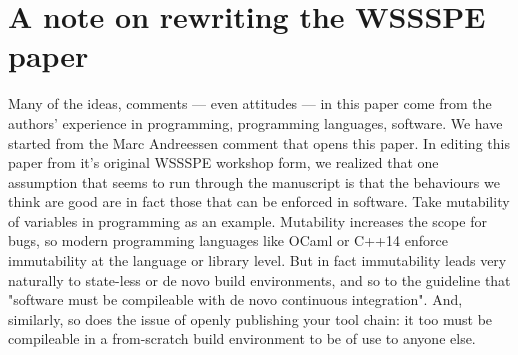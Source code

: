 \documentclass[a4paper,11pt]{article}
\begin{document}
\section{A note on rewriting the WSSSPE paper}

Many of the ideas, comments --- even attitudes --- in this paper come 
from the authors' experience in programming, programming languages, 
software. We have started from the Marc Andreessen 
comment that opens this paper. In editing this paper from it's 
original WSSSPE workshop form,  we realized that one assumption that 
seems to run through the manuscript  is that the behaviours we think 
are good are in fact those that can be enforced in software. 
Take mutability of variables in programming as an example. Mutability 
increases the scope for bugs, so modern programming languages like OCaml 
or C++14 enforce immutability at the language or library level. But 
in fact immutability leads very naturally to state-less or de novo
build environments, and so to the guideline that "software must be compileable
with de novo continuous integration". 
And, similarly, so does the issue of openly publishing your tool chain:
it too must be compileable in a from-scratch build environment to be of 
use to anyone else. 




\end{document}
